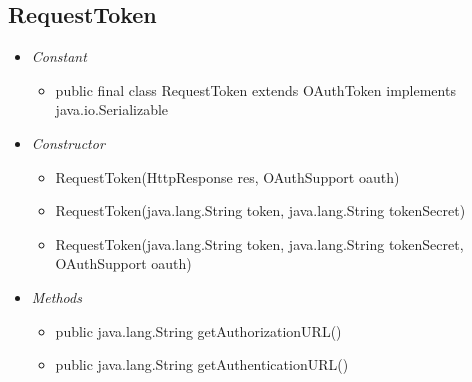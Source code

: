 \subsection{RequestToken}
	\begin{itemize}
		\item \textit{Constant}
		
		\begin{itemize}
			\item public final class RequestToken
			extends OAuthToken
			implements java.io.Serializable
			
		\end{itemize}
		\item \textit{Constructor}
		
		\begin{itemize}
			\item RequestToken(HttpResponse res, OAuthSupport oauth) 
			\item RequestToken(java.lang.String token, java.lang.String tokenSecret)
			\item RequestToken(java.lang.String token, java.lang.String tokenSecret, OAuthSupport oauth) 
		\end{itemize}
		\item \textit{Methods}
		
		\begin{itemize}
			\item public java.lang.String getAuthorizationURL()
			\item public java.lang.String getAuthenticationURL()
		\end{itemize}
	\end{itemize}
	
